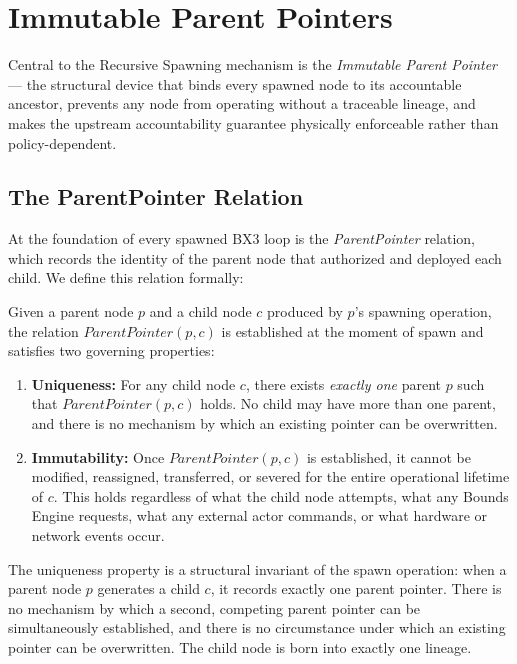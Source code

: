 \section{Immutable Parent Pointers}
\label{sec:immutable-parent-pointers}

Central to the Recursive Spawning mechanism is the \textit{Immutable Parent Pointer} — the structural device that binds every spawned node to its accountable ancestor, prevents any node from operating without a traceable lineage, and makes the upstream accountability guarantee physically enforceable rather than policy-dependent.

\subsection{The ParentPointer Relation}

At the foundation of every spawned BX3 loop is the \textit{ParentPointer} relation, which records the identity of the parent node that authorized and deployed each child. We define this relation formally:

\begin{definition}[ParentPointer]
\label{def:parent-pointer}
Given a parent node $p$ and a child node $c$ produced by $p$'s spawning operation, the relation $\textit{ParentPointer}(p, c)$ is established at the moment of spawn and satisfies two governing properties:

\begin{enumerate}[noitemsep]
    \item \textbf{Uniqueness:} For any child node $c$, there exists \textit{exactly one} parent $p$ such that $\textit{ParentPointer}(p, c)$ holds. No child may have more than one parent, and there is no mechanism by which an existing pointer can be overwritten.
    \item \textbf{Immutability:} Once $\textit{ParentPointer}(p, c)$ is established, it cannot be modified, reassigned, transferred, or severed for the entire operational lifetime of $c$. This holds regardless of what the child node attempts, what any Bounds Engine requests, what any external actor commands, or what hardware or network events occur.
\end{enumerate}
\end{definition}

The uniqueness property is a structural invariant of the spawn operation: when a parent node $p$ generates a child $c$, it records exactly one parent pointer. There is no mechanism by which a second, competing parent pointer can be simultaneously established, and there is no circumstance under which an existing pointer can be overwritten. The child node is born into exactly one lineage.

